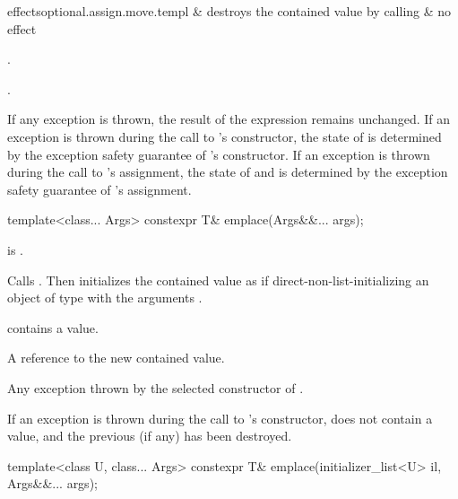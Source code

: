 \begin{itemdescr}
\begin{lib2dtab2}{ effects}{optional.assign.move.templ}
 &
destroys the contained value by calling  &
no effect \\
\end{lib2dtab2}

\pnum
\ensures
{}.

\pnum
\returns
{}.

\pnum
\remarks
If any exception is thrown,
the result of the expression  remains unchanged.
If an exception is thrown during the call to 's constructor,
the state of  is determined by
the exception safety guarantee of 's constructor.
If an exception is thrown during the call to 's assignment,
the state of  and  is determined by
the exception safety guarantee of 's assignment.
\end{itemdescr}

%
\begin{itemdecl}
template<class... Args> constexpr T& emplace(Args&&... args);
\end{itemdecl}

\begin{itemdescr}
\pnum
\mandates
{} is .

\pnum
\effects
Calls . Then initializes the contained value as if direct-non-list-initializing an object of type  with the arguments .

\pnum
\ensures
{} contains a value.

\pnum
\returns
A reference to the new contained value.

\pnum
\throws
Any exception thrown by the selected constructor of .

\pnum
\remarks
If an exception is thrown during the call to 's constructor,  does not contain a value, and the previous  (if any) has been destroyed.
\end{itemdescr}

%
\begin{itemdecl}
template<class U, class... Args> constexpr T& emplace(initializer_list<U> il, Args&&... args);
\end{itemdecl}

